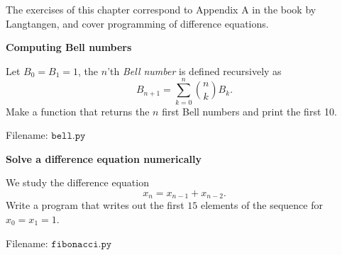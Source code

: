 The exercises of this chapter correspond to Appendix A in the book by Langtangen,
and cover programming of difference equations.

\begin{Problem}{\textbf{Computing Bell numbers}}

\noindent Let $B_0=B_1=1$, the $n$'th \emph{Bell number} is defined recursively as
\begin{equation*}
    B_{n+1}=\sum_{k=0}^n \binom{n}{k}B_k.
\end{equation*}
Make a function that returns the $n$ first Bell numbers and print the first 10.

Filename: $\texttt{bell.py}$
\end{Problem}

\begin{Problem}{\textbf{Solve a difference equation numerically}}

\noindent We study the difference equation
\begin{equation*}
x_n = x_{n-1} + x_{n-2}.
\end{equation*}
Write a program that writes out the first $15$ elements of the sequence for $x_0 = x_1 = 1$.

Filename: $\texttt{fibonacci.py}$
\end{Problem}


